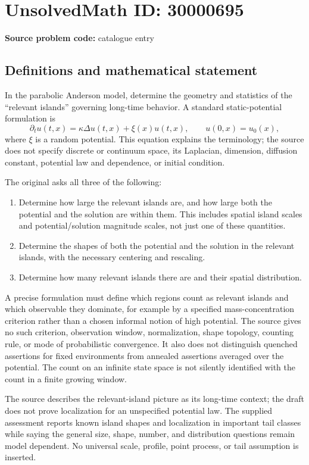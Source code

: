 \documentclass[11pt]{article}
\begin{document}
\section*{UnsolvedMath ID: 30000695}
\textbf{Source problem code:} catalogue entry
\subsection{Definitions and mathematical statement}
In the parabolic Anderson model, determine the geometry and statistics of the ``relevant islands'' governing long-time behavior. A standard static-potential formulation is
\[
 \partial_tu(t,x)=\kappa\Delta u(t,x)+\xi(x)u(t,x),
 \qquad u(0,x)=u_0(x),
\]
where $\xi$ is a random potential. This equation explains the terminology; the source does not specify discrete or continuum space, its Laplacian, dimension, diffusion constant, potential law and dependence, or initial condition.

The original asks all three of the following:
\begin{enumerate}
\item Determine how large the relevant islands are, and how large both the potential and the solution are within them. This includes spatial island scales and potential/solution magnitude scales, not just one of these quantities.
\item Determine the shapes of both the potential and the solution in the relevant islands, with the necessary centering and rescaling.
\item Determine how many relevant islands there are and their spatial distribution.
\end{enumerate}

A precise formulation must define which regions count as relevant islands and which observable they dominate, for example by a specified mass-concentration criterion rather than a chosen informal notion of high potential. The source gives no such criterion, observation window, normalization, shape topology, counting rule, or mode of probabilistic convergence. It also does not distinguish quenched assertions for fixed environments from annealed assertions averaged over the potential. The count on an infinite state space is not silently identified with the count in a finite growing window.

The source describes the relevant-island picture as its long-time context; the draft does not prove localization for an unspecified potential law. The supplied assessment reports known island shapes and localization in important tail classes while saying the general size, shape, number, and distribution questions remain model dependent. No universal scale, profile, point process, or tail assumption is inserted.
\end{document}
